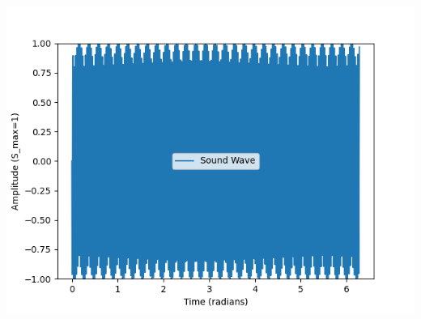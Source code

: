 \documentclass[journal,12pt,twocolumn]{IEEEtran}
\theoremstyle{remark}
\begin{document}
\includegraphics[scale=0.65]{images/plot.png}




        
        
        
             
             
        

        













\renewcommand{\thefigure}{\theenumi}
\renewcommand{\thetable}{\theenumi}
\end{document}
